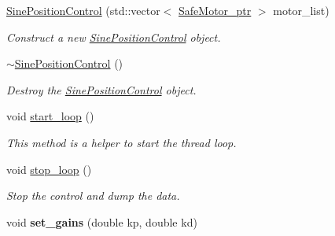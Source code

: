 \begin{DoxyCompactItemize}
\item 
\hyperlink{classblmc__drivers_1_1SinePositionControl_a6f5a006338c7975f9aeef5987384c661}{Sine\+Position\+Control} (std\+::vector$<$ \hyperlink{namespaceblmc__drivers_ab975c3be3c53a93a10c491f07a132e2b}{Safe\+Motor\+\_\+ptr} $>$ motor\+\_\+list)
\begin{DoxyCompactList}\small\item\em Construct a new \hyperlink{classblmc__drivers_1_1SinePositionControl}{Sine\+Position\+Control} object. \end{DoxyCompactList}\item 
\mbox{\label{classblmc__drivers_1_1SinePositionControl_a35004249215059c73863e71680b977a8}} 
\hyperlink{classblmc__drivers_1_1SinePositionControl_a35004249215059c73863e71680b977a8}{$\sim$\+Sine\+Position\+Control} ()
\begin{DoxyCompactList}\small\item\em Destroy the \hyperlink{classblmc__drivers_1_1SinePositionControl}{Sine\+Position\+Control} object. \end{DoxyCompactList}\item 
\mbox{\label{classblmc__drivers_1_1SinePositionControl_a0766604ca7e58200e97547e61e0f4cc8}} 
void \hyperlink{classblmc__drivers_1_1SinePositionControl_a0766604ca7e58200e97547e61e0f4cc8}{start\+\_\+loop} ()
\begin{DoxyCompactList}\small\item\em This method is a helper to start the thread loop. \end{DoxyCompactList}\item 
\mbox{\label{classblmc__drivers_1_1SinePositionControl_a61875cedee870d5cc0cb5e10799b1c24}} 
void \hyperlink{classblmc__drivers_1_1SinePositionControl_a61875cedee870d5cc0cb5e10799b1c24}{stop\+\_\+loop} ()
\begin{DoxyCompactList}\small\item\em Stop the control and dump the data. \end{DoxyCompactList}\item 
\mbox{\label{classblmc__drivers_1_1SinePositionControl_a0a86810773b5a172cbc5f407fa59df4d}} 
void {\bfseries set\+\_\+gains} (double kp, double kd)
\end{DoxyCompactItemize}
